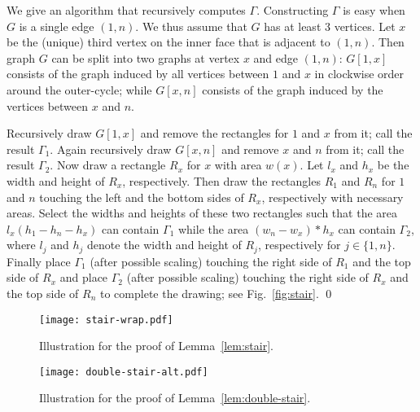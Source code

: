 \documentclass{llncs}
\renewenvironment{proof}{\medskip\noindent{\bf Proof:}}{\mbox{}\hfill\qed\par}
\begin{document}
\begin{proof}
We give an algorithm that recursively computes $\Gamma$. Constructing $\Gamma$ is easy
 when $G$ is a single edge $(1,n)$. We thus assume that $G$ has at least 3 vertices. Let $x$
 be the (unique) third vertex on the inner face that is adjacent to $(1,n)$. Then graph $G$ can
 be split into two graphs at vertex $x$ and edge $(1,n)$: $G[1,x]$ consists of the graph induced
 by all vertices between $1$ and $x$ in clockwise order around the outer-cycle; while $G[x,n]$
 consists of the graph induced by the vertices between $x$ and $n$.





Recursively draw $G[1,x]$ and remove the rectangles for $1$ and $x$ from it; call the result
 $\Gamma_1$. Again recursively draw $G[x,n]$ and remove $x$ and $n$ from it; call the result
 $\Gamma_2$. Now draw a rectangle $R_x$ for $x$ with area $w(x)$. Let $l_x$ and $h_x$ be
 the width and height of $R_x$, respectively. Then draw the rectangles $R_1$ and $R_n$ for
 $1$ and $n$ touching the left and the bottom sides of $R_x$, respectively with necessary areas.
 Select the widths and heights of these two rectangles such that the area $l_x(h_1-h_n-h_x)$
 can contain $\Gamma_1$ while the area $(w_n-w_x)*h_x$ can contain $\Gamma_2$, where
 $l_j$ and $h_j$ denote the width and height of $R_j$, respectively for $j\in\{1,n\}$. Finally
 place $\Gamma_1$ (after possible scaling) touching the right side of $R_1$ and the top side
 of $R_x$ and place $\Gamma_2$ (after possible scaling) touching the right side of $R_x$ and
 the top side of $R_n$ to complete the drawing; see Fig.~\ref{fig:stair}.
\end{proof}



\begin{figure}[tb]
\hfill
\begin{minipage}[b]{.4\textwidth}
	\centering
	\texttt{[image: stair-wrap.pdf]}
	\caption{Illustration for the proof of Lemma~\ref{lem:stair}.}
	\label{fig:stair}
\end{minipage}
\hfill
\begin{minipage}[b]{.4\textwidth}
	\centering
	\texttt{[image: double-stair-alt.pdf]}
	\caption{Illustration for the proof of Lemma~\ref{lem:double-stair}.}
\label{fig:double-stair}
\end{minipage}
\hfill
\end{figure}
\end{document}
